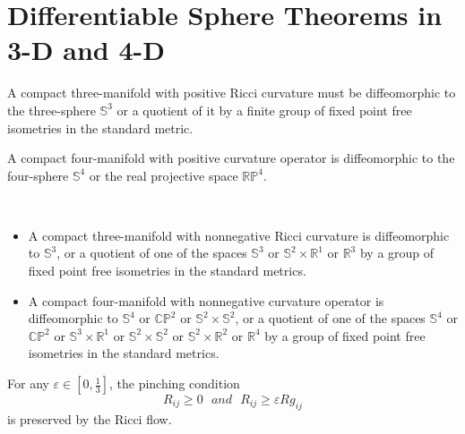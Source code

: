 \section{Differentiable Sphere Theorems in 3-D and 4-D}
\begin{theorem}
  \label{thm:cz-three-manifold-positive-ricci-sphere}

A compact three-manifold with positive Ricci curvature must be
diffeomorphic to the three-sphere $\mathbb{S}^3$ or a quotient of
it by a finite group of fixed point free isometries in the
standard metric.
\end{theorem}
\begin{theorem}
  \label{thm:cz-four-manifold-positive-curvature-operator-sphere}

A compact four-manifold with positive curvature operator is
diffeomorphic to the four-sphere $\mathbb{S}^4$ or the real
projective space $\mathbb{RP}^4$.
\end{theorem}
\begin{theorem}
  \label{thm:cz-nonnegative-curvature-low-dimensional-classification}
 \
\begin{itemize}
\item[(i)] A compact three-manifold with nonnegative Ricci
curvature is diffeomorphic to $\mathbb{S}^3$, or a quotient of one
of the spaces $\mathbb{S}^3$ or $\mathbb{S}^2\times\mathbb{R}^1$
or $\mathbb{R}^3$ by a group of fixed point free isometries in the
standard metrics. \item[(ii)] A compact four-manifold with
nonnegative curvature operator is diffeomorphic to $\mathbb{S}^4$
or $\mathbb{CP}^2$ or $\mathbb{S}^2\times \mathbb{S}^2$, or a
quotient of one of the spaces $\mathbb{S}^4$ or $\mathbb{CP}^2$ or
$\mathbb{S}^3\times\mathbb{R}^1$ or $\mathbb{S}^2\times
\mathbb{S}^2$ or $\mathbb{S}^2\times \mathbb{R}^2$ or
$\mathbb{R}^4$ by a group of fixed point free isometries in the
standard metrics.
\end{itemize}
\end{theorem}
\begin{lemma} 
  \label{lem:cz-three-dimensional-ricci-pinching-preserved}

For any $\varepsilon\in[0,\frac{1}{3}]$, the pinching condition
$$
R_{ij}\geq0\ \ \ and\ \ \ R_{ij}\geq\varepsilon Rg_{ij}
$$
is preserved by the Ricci flow.
\end{lemma}
